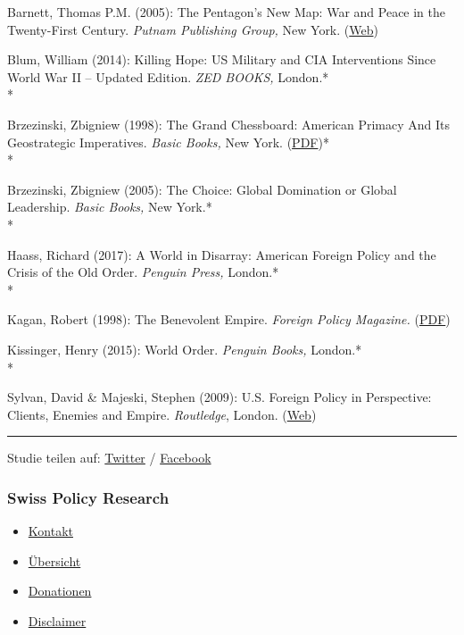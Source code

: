 Barnett, Thomas P.M. (2005): The Pentagon's New Map: War and Peace in
the Twenty-First Century. \emph{Putnam Publishing Group,} New York.
(\href{http://www.esquire.com/news-politics/a1546/thomas-barnett-iraq-war-primer/}{Web})

Blum, William (2014): Killing Hope: US Military and CIA Interventions
Since World War II -- Updated Edition. \emph{ZED BOOKS,} London.*\\
*

Brzezinski, Zbigniew (1998): The Grand Chessboard: American Primacy And
Its Geostrategic Imperatives. \emph{Basic Books,} New York.
(\href{https://archive.org/details/TheGrandChessboardAmericanPrimacyAndItsGeostrategicImperatives1997ZbigniewBrzezinski}{PDF})*\\
*

Brzezinski, Zbigniew (2005): The Choice: Global Domination or Global
Leadership. \emph{Basic Books,} New York.*\\
*

Haass, Richard (2017): A World in Disarray: American Foreign Policy and
the Crisis of the Old Order. \emph{Penguin Press,} London.*\\
*

Kagan, Robert (1998): The Benevolent Empire. \emph{Foreign Policy
Magazine.}
(\href{http://carnegieendowment.org/1998/06/01/benevolent-empire-pub-275}{PDF})

Kissinger, Henry (2015): World Order. \emph{Penguin Books,} London.*\\
*

Sylvan, David \& Majeski, Stephen (2009): U.S. Foreign Policy in
Perspective: Clients, Enemies and Empire. \emph{Routledge}, London.
(\href{http://www.us-foreign-policy-perspective.org/}{Web})

\begin{center}\rule{0.5\linewidth}{\linethickness}\end{center}

Studie teilen auf:
\href{https://twitter.com/intent/tweet?url=https://swprs.org/die-propaganda-matrix/}{Twitter}
/
\href{https://www.facebook.com/share.php?u=https://swprs.org/die-propaganda-matrix/}{Facebook}

\hypertarget{swiss-policy-research}{%
\subsubsection{Swiss Policy Research}\label{swiss-policy-research}}

\begin{itemize}
\tightlist
\item
  \href{https://swprs.org/kontakt/}{Kontakt}
\item
  \href{https://swprs.org/uebersicht/}{Übersicht}
\item
  \href{https://swprs.org/donationen/}{Donationen}
\item
  \href{https://swprs.org/disclaimer/}{Disclaimer}
\end{itemize}

